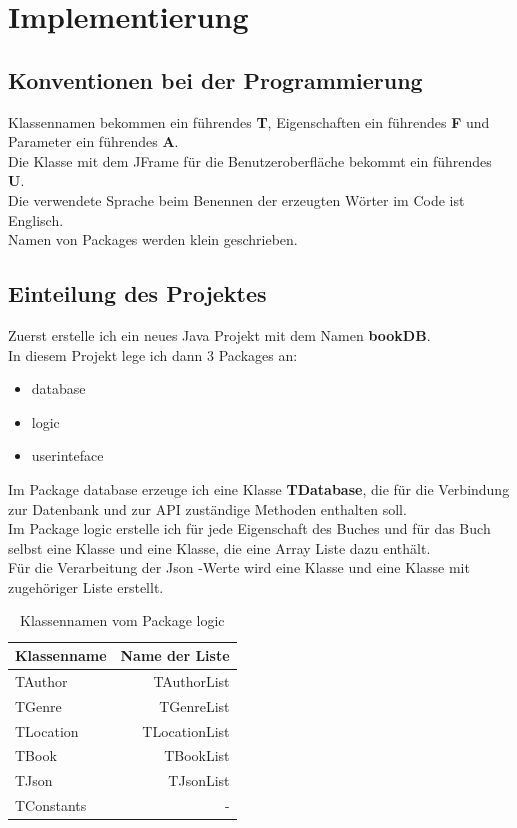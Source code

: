 \section{Implementierung}
\subsection{Konventionen bei der Programmierung}
Klassennamen bekommen ein führendes \textbf{T}, Eigenschaften ein 
führendes \textbf{F} und Parameter ein führendes \textbf{A}.\\
Die Klasse mit dem JFrame für die Benutzeroberfläche bekommt ein führendes \textbf{U}.\\
Die verwendete Sprache beim Benennen der erzeugten Wörter im Code ist Englisch.\\
Namen von Packages werden klein geschrieben.

\subsection{Einteilung des Projektes}
Zuerst erstelle ich ein neues Java Projekt mit dem Namen \textbf{bookDB}.\\
In diesem Projekt lege ich dann 3 Packages an:
\begin{itemize}
\item{database}
\item{logic}
\item{userinteface}
\end{itemize}
Im Package database erzeuge ich eine Klasse \textbf{TDatabase}, die für die Verbindung zur Datenbank und zur API zuständige Methoden enthalten soll.\\
Im Package logic erstelle ich für jede Eigenschaft des Buches und für das Buch selbst eine Klasse und eine Klasse, die eine Array Liste dazu enthält.\\
Für die Verarbeitung der Json -Werte wird eine Klasse und eine Klasse mit zugehöriger Liste erstellt.\\
\begin{center}
\begin{table} [htb] %
\centering
\begin{tabular}{  l  r  }
\hline
\rowcolor{cyan}\textbf{Klassenname}&\textbf{Name der Liste}\\
\hline
TAuthor&TAuthorList\\
\rowcolor{lightgray}TGenre&TGenreList\\
TLocation&TLocationList\\
\rowcolor{lightgray}TBook&TBookList\\
TJson&TJsonList\\
\rowcolor{lightgray}TConstants&-\\
\hline
\end{tabular}
\caption{Klassennamen vom Package logic}
\label{tab:Klassennamen_logic}
\end{table}
\end{center}


